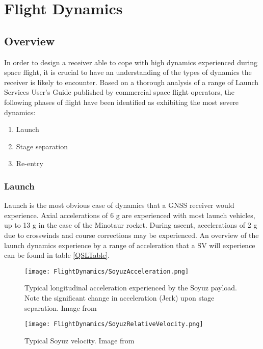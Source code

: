 \label{ch:FlightDynamics}
\chapter{Flight Dynamics}

\section{Overview}
In order to design a receiver able to cope with high dynamics experienced during space flight, it is crucial to have an understanding of the types of dynamics the receiver is likely to encounter. Based on a thorough analysis of a range of Launch Services User's Guide published by commercial space flight operators, the following phases of flight have been identified as exhibiting the most severe dynamics: 

\begin{enumerate}
\item{Launch}
\item{Stage separation}
\item{Re-entry}
\end{enumerate}

\subsection{Launch}
Launch is the most obvious case of dynamics that a \ac{GNSS} receiver would experience. Axial accelerations of 6 g are experienced with most launch vehicles, up to 13 g in the case of the Minotaur rocket. During ascent, accelerations of 2 g due to crosswinds and course corrections may be experienced. An overview of the launch dynamics experience by a range of acceleration that a \ac{SV} will experience can be found in table \ref{QSLTable}.

\begin{figure}[!htb] 
    \centering
    \texttt{[image: FlightDynamics/SoyuzAcceleration.png]} 
    \caption{Typical longitudinal acceleration experienced by the Soyuz payload. Note the significant change in acceleration (Jerk) upon stage separation. Image from \cite{Soyuz}}
    \label{fig:SoyuzAcceleration}
\end{figure}

\begin{figure}[!htb] 
    \centering
    \texttt{[image: FlightDynamics/SoyuzRelativeVelocity.png]} 
    \caption{Typical Soyuz velocity. Image from \cite{Soyuz}}
    \label{fig:SoyuzRelativeVelocity}
\end{figure}



